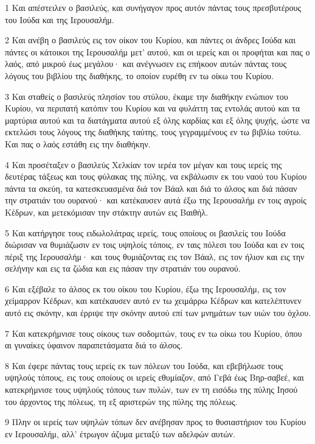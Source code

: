 \par 1 Και απέστειλεν ο βασιλεύς, και συνήγαγον προς αυτόν πάντας τους πρεσβυτέρους του Ιούδα και της Ιερουσαλήμ.
\par 2 Και ανέβη ο βασιλεύς εις τον οίκον του Κυρίου, και πάντες οι άνδρες Ιούδα και πάντες οι κάτοικοι της Ιερουσαλήμ μετ' αυτού, και οι ιερείς και οι προφήται και πας ο λαός, από μικρού έως μεγάλου· και ανέγνωσεν εις επήκοον αυτών πάντας τους λόγους του βιβλίου της διαθήκης, το οποίον ευρέθη εν τω οίκω του Κυρίου.
\par 3 Και σταθείς ο βασιλεύς πλησίον του στύλου, έκαμε την διαθήκην ενώπιον του Κυρίου, να περιπατή κατόπιν του Κυρίου και να φυλάττη τας εντολάς αυτού και τα μαρτύρια αυτού και τα διατάγματα αυτού εξ όλης καρδίας και εξ όλης ψυχής, ώστε να εκτελώσι τους λόγους της διαθήκης ταύτης, τους γεγραμμένους εν τω βιβλίω τούτω. Και πας ο λαός εστάθη εις την διαθήκην.
\par 4 Και προσέταξεν ο βασιλεύς Χελκίαν τον ιερέα τον μέγαν και τους ιερείς της δευτέρας τάξεως και τους φύλακας της πύλης, να εκβάλωσιν εκ του ναού του Κυρίου πάντα τα σκεύη, τα κατεσκευασμένα διά τον Βάαλ και διά το άλσος και διά πάσαν την στρατιάν του ουρανού· και κατέκαυσεν αυτά έξω της Ιερουσαλήμ εν τοις αγροίς Κέδρων, και μετεκόμισαν την στάκτην αυτών εις Βαιθήλ.
\par 5 Και κατήργησε τους ειδωλολάτρας ιερείς, τους οποίους οι βασιλείς του Ιούδα διώρισαν να θυμιάζωσιν εν τοις υψηλοίς τόποις, εν ταις πόλεσι του Ιούδα και εν τοις πέριξ της Ιερουσαλήμ· και τους θυμιάζοντας εις τον Βάαλ, εις τον ήλιον και εις την σελήνην και εις τα ζώδια και εις πάσαν την στρατιάν του ουρανού.
\par 6 Και εξέβαλε το άλσος εκ του οίκου του Κυρίου, έξω της Ιερουσαλήμ, εις τον χείμαρρον Κέδρων, και κατέκαυσεν αυτό εν τω χειμάρρω Κέδρων και κατελέπτυνεν αυτό εις σκόνην, και έρριψε την σκόνην αυτού επί των μνημάτων των υιών του όχλου.
\par 7 Και κατεκρήμνισε τους οίκους των σοδομιτών, τους εν τω οίκω του Κυρίου, όπου αι γυναίκες ύφαινον παραπετάσματα διά το άλσος.
\par 8 Και έφερε πάντας τους ιερείς εκ των πόλεων του Ιούδα, και εβεβήλωσε τους υψηλούς τόπους, εις τους οποίους οι ιερείς εθυμίαζον, από Γεβά έως Βηρ-σαβεέ, και κατεκρήμνισε τους υψηλούς τόπους των πυλών, των εν τη εισόδω της πύλης Ιησού του άρχοντος της πόλεως, τη εξ αριστερών της πύλης της πόλεως.
\par 9 Πλην οι ιερείς των υψηλών τόπων δεν ανέβησαν προς το θυσιαστήριον του Κυρίου εν Ιερουσαλήμ, αλλ' έτρωγον άζυμα μεταξύ των αδελφών αυτών.
